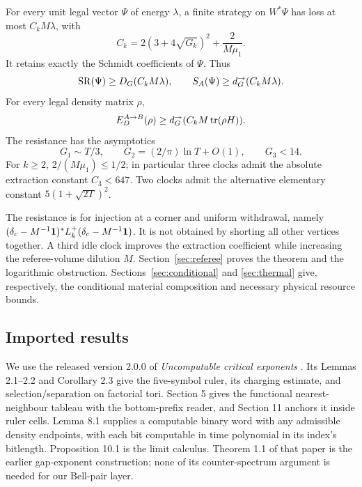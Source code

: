 \begin{theorem}\label{thm:extraction}
For every unit legal vector $\Psi$ of energy $\lambda$, a finite
strategy on $W^*\Psi$ has loss at most $C_k M\lambda$, with
\begin{equation}\label{eq:constant}
 C_k=2(3+4\sqrt{G_k})^2+\frac{2}{M\mu_1}.
\end{equation}
It retains exactly the Schmidt coefficients of $\Psi$. Thus
\[
 \operatorname{SR}(\Psi)\geq D_G(C_kM\lambda),\qquad
 S_A(\Psi)\geq d_G^{\to}(C_kM\lambda).
\]
For every legal density matrix $\rho$,
\begin{equation}\label{eq:mixed-main}
 E_D^{A\to B}(\rho)\geq d_G^{\to}(C_kM\operatorname{tr}(\rho H)).
\end{equation}
The resistance has the asymptotics
\[
 G_1\sim T/3,\qquad G_2=(2/\pi)\ln T+O(1),\qquad G_3<14.
\]
For $k\geq2$, $2/(M\mu_1)\leq1/2$; in particular three clocks admit
the absolute extraction constant $C_3<647$. Two clocks admit the
alternative elementary constant $5(1+\sqrt{2T})^2$.
\end{theorem}

The resistance is for injection at a corner and uniform withdrawal,
namely $(\delta_c-M^{-1}\mathbf 1)^*L_k^+(\delta_c-M^{-1}\mathbf 1)$.
It is not obtained by shorting all other vertices together. A third
idle clock improves the extraction coefficient while increasing the
referee-volume dilution $M$. Section~\ref{sec:referee} proves the
theorem and the logarithmic obstruction. Sections~\ref{sec:conditional}
and \ref{sec:thermal} give, respectively, the conditional material
composition and necessary physical resource bounds.

\subsection{Imported results}\label{sec:imports}
We use the released version 2.0.0 of \emph{Uncomputable critical
exponents} \cite{gap}. Its Lemmas 2.1--2.2 and Corollary 2.3 give the
five-symbol ruler, its charging estimate, and selection/separation on
factorial tori. Section 5 gives the functional nearest-neighbour tableau
with the bottom-prefix reader, and Section 11 anchors it inside ruler
cells. Lemma 8.1 supplies a computable binary word with any admissible
density endpoints, with each bit computable in time polynomial in its
index's bitlength. Proposition 10.1 is the limit calculus. Theorem 1.1
of that paper is the earlier gap-exponent construction; none of its
counter-spectrum argument is needed for our Bell-pair layer.

